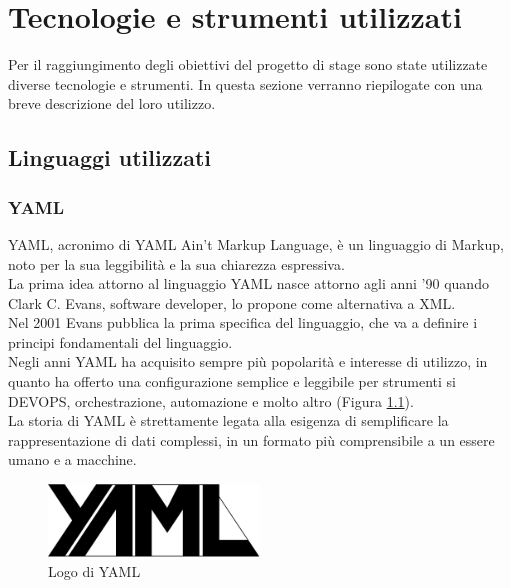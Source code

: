 \chapter{Tecnologie e strumenti utilizzati}\label{cap:Tecnologie e strumenti utilizzati}
Per il raggiungimento degli obiettivi del progetto di stage sono state utilizzate diverse tecnologie e strumenti. 
In questa sezione verranno riepilogate con una breve descrizione del loro utilizzo. 
\section{Linguaggi utilizzati}
\subsection{YAML}
YAML, acronimo di YAML Ain't Markup Language, è un linguaggio di Markup, noto per la sua leggibilità e la sua 
chiarezza espressiva. \\
La prima idea attorno al linguaggio YAML nasce attorno agli anni '90 quando Clark C. Evans, software developer, lo propone come alternativa a XML.\\
Nel 2001 Evans pubblica la prima specifica del linguaggio, che va a definire i principi fondamentali del linguaggio.\\
Negli anni YAML ha acquisito sempre più popolarità e interesse di utilizzo, in quanto ha offerto una configurazione semplice e leggibile 
per strumenti si DEVOPS, orchestrazione, automazione e molto altro (Figura \ref{fig:yaml}).\\
La storia di YAML è strettamente legata alla esigenza di semplificare la rappresentazione di dati complessi, 
in un formato più comprensibile a un essere umano e a macchine.\\
\begin{figure}[hpp]
    \centering
    \includegraphics[width=0.5\textwidth]{images/tecnologie/logo_yaml.png}
    \caption{Logo di YAML}
    \label{fig:yaml}
\end{figure}
\pagebreak
